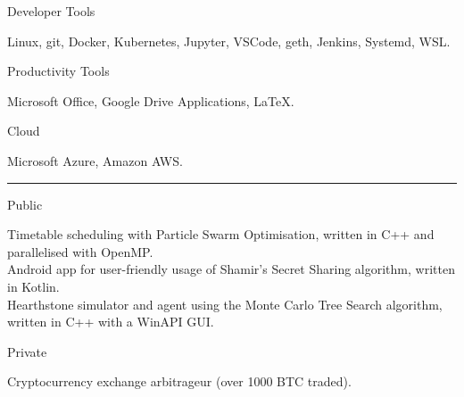 \documentclass[a4paper,10pt]{article}
\newlength{\cvcolumngapwidth}
\newlength{\cvleftcolumnwidth}
\newlength{\cvrightcolumnwidth}
\newcommand{\cvsectionstyle}[1]{{\normalsize\cvsectionfont\textcolor{cvsectioncolor}{#1}}}
\newcommand{\cvheadingstyle}[1]{{\normalsize\cvheadingfont\textcolor{cvheadingcolor}{#1}}}
\newlength{\cvafteritemskipamount}
\newlength{\cvaftersectionskipamount}
\newlength{\cvbetweensectionandheadingextraskipamount}
\newlength{\cvparskip}
\newcommand{\cvsection}[1]{
    \begin{minipage}[t]{\cvleftcolumnwidth}
        \raggedleft\cvsectionstyle{#1}
    \end{minipage}%
    \hspace{\cvcolumngapwidth}%
    \begin{minipage}[t]{\cvrightcolumnwidth}
        \textcolor{cvrulecolor}{\rule{\cvrightcolumnwidth}{0.3mm}}
    \end{minipage}

    \vspace{\cvaftersectionskipamount}
}
\newcommand{\cvitem}[2]{
    \begin{minipage}[t]{\cvleftcolumnwidth}
        \raggedleft #1
    \end{minipage}%
    \hspace{\cvcolumngapwidth}%
    \begin{minipage}[t]{\cvrightcolumnwidth}
        \setlength{\parskip}{\cvparskip} #2
    \end{minipage}

    \vspace{\cvafteritemskipamount}
}
\begin{document}
\cvitem{
    \cvheadingstyle{Developer Tools}
}{
    Linux, git, Docker, Kubernetes, Jupyter, VSCode, geth, Jenkins, Systemd, WSL.
}

\cvitem{
    \cvheadingstyle{Productivity Tools}
}{
    Microsoft Office, Google Drive Applications, \LaTeX.
}

\cvitem{
    \cvheadingstyle{Cloud}
}{
    Microsoft Azure, Amazon AWS.
}


\cvsection{PERSONAL PROJECTS}

\vspace{\cvbetweensectionandheadingextraskipamount}

\cvitem{
    \cvheadingstyle{Public}
}{
    Timetable scheduling with Particle Swarm Optimisation, written in C++ and parallelised with OpenMP. \\
    
    Android app for user-friendly usage of Shamir's Secret Sharing algorithm, written in Kotlin. \\
    
    Hearthstone simulator and agent using the Monte Carlo Tree Search algorithm, written in C++ with a WinAPI GUI.
}
\vspace{\cvbetweensectionandheadingextraskipamount}
\cvitem{
    \cvheadingstyle{Private}
}{
    Cryptocurrency exchange arbitrageur (over 1000 BTC traded).
}
\end{document}

